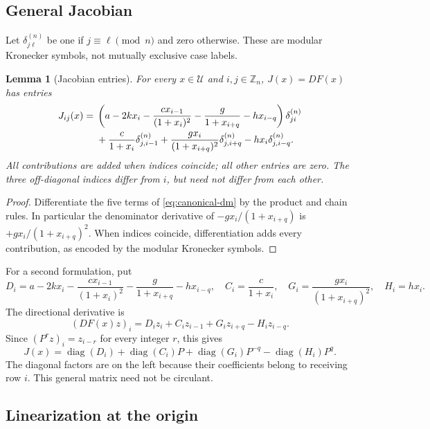 \documentclass[11pt]{article}
\newcommand{\Zn}{\mathbb{Z}_n}
\newcommand{\Domain}{\mathcal{U}}
\DeclareMathOperator{\diag}{diag}
\newtheorem{lemma}[theorem]{Lemma}
\theoremstyle{definition}
\theoremstyle{remark}
\begin{document}
\subsection{General Jacobian}

Let $\delta^{(n)}_{j\ell}$ be one if $j\equiv\ell\pmod n$ and
zero otherwise. These are modular Kronecker symbols, not mutually
exclusive case labels.

\begin{lemma}[Jacobian entries]
\label{lem:P03-jacobian}
For every $x\in\Domain$ and $i,j\in\Zn$, $J(x)=DF(x)$ has entries
\begin{align}
 J_{ij}(x)={}&\left(a-2kx_i-\frac{c x_{i-1}}{(1+x_i)^2}
             -\frac{g}{1+x_{i+q}}-h x_{i-q}\right)
                 \delta^{(n)}_{ji}\notag\\
 &+\frac{c}{1+x_i}\delta^{(n)}_{j,i-1}
   +\frac{g x_i}{(1+x_{i+q})^2}\delta^{(n)}_{j,i+q}
   -h x_i\delta^{(n)}_{j,i-q}.
 \label{eq:P03-general-entries}
\end{align}
All contributions are added when indices coincide; all other entries
are zero. The three off-diagonal indices differ from $i$, but need
not differ from each other.
\end{lemma}
\begin{proof}
Differentiate the five terms of \eqref{eq:canonical-dm} by the product
and chain rules. In particular the denominator derivative of
$-gx_i/(1+x_{i+q})$ is $+gx_i/(1+x_{i+q})^2$.
When indices coincide, differentiation adds every contribution,
as encoded by the modular Kronecker symbols.
\end{proof}

For a second formulation, put
\[
 D_i=a-2kx_i-\frac{c x_{i-1}}{(1+x_i)^2}
            -\frac{g}{1+x_{i+q}}-h x_{i-q},\quad
 C_i=\frac{c}{1+x_i},\quad
 G_i=\frac{g x_i}{(1+x_{i+q})^2},\quad H_i=h x_i.
\]
The directional derivative is
\begin{equation}
 (DF(x)z)_i=D_i z_i+C_i z_{i-1}+G_i z_{i+q}-H_i z_{i-q}.
 \label{eq:P03-directional}
\end{equation}
Since $(P^r z)_i=z_{i-r}$ for every integer $r$, this gives
\begin{equation}
 J(x)=\diag(D_i)+\diag(C_i)P+\diag(G_i)P^{-q}
                           -\diag(H_i)P^q.
 \label{eq:P03-variable-matrix}
\end{equation}
The diagonal factors are on the left because their coefficients
belong to receiving row $i$. This general matrix need not be circulant.

\subsection{Linearization at the origin}
\label{slot:P03-1}
\end{document}
